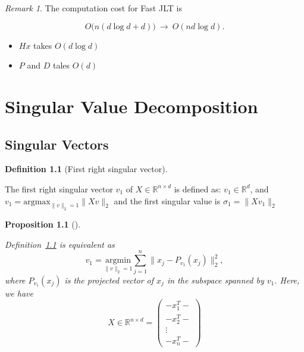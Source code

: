 \documentclass[
  letterpaper,
  DIV=11,
  numbers=noendperiod]{scrreprt}
\providecommand{\tightlist}{%
  \setlength{\itemsep}{0pt}\setlength{\parskip}{0pt}}
\theoremstyle{definition}
\newtheorem{definition}{Definition}[chapter]
\theoremstyle{plain}
\theoremstyle{plain}
\newtheorem{proposition}{Proposition}[chapter]
\theoremstyle{definition}
\theoremstyle{plain}
\theoremstyle{plain}
\theoremstyle{remark}
\newtheorem*{remark}{Remark}
\begin{document}
\begin{remark}
The computation cost for Fast JLT is

\[
O\big(n(d \log d + d)\big) \ \longrightarrow\ O(n d \log d).
\]

\begin{itemize}
\tightlist
\item
  \(Hx\) takes \(O(d\log d)\)
\item
  \(P\) and \(D\) tales \(O(d)\)
\end{itemize}

\end{remark}

\chapter{Singular Value
Decomposition}\label{singular-value-decomposition}

\section{Singular Vectors}\label{singular-vectors}

\begin{definition}[First right singular
vector]\protect\hypertarget{def-1stSingularVec}{}\label{def-1stSingularVec}

The first right singular vector \(v_1\) of
\(X \in \mathbb{R}^{n \times d}\) is defined as:
\(v_1 \in \mathbb{R}^d\), and
\(v_1 = \text{argmax}_{\|v\|_2=1} \|Xv\|_2\) and the first singular
value is \(\sigma_1 = \|Xv_1\|_2\)

\end{definition}

\begin{proposition}[]\protect\hypertarget{prp-equivSingular}{}\label{prp-equivSingular}

Definition~\ref{def-1stSingularVec} is equivalent as \[
v_1 = \underset{\|v\|_2=1}{\mathrm{argmin}} \sum_{j=1}^{n} \|x_j - P_{v_1}(x_j)\|_2^2,
\] where \(P_{v_1}(x_j)\) is the projected vector of \(x_j\) in the
subspace spanned by \(v_1\). Here, we have \[
X \in \mathbb{R}^{n \times d} = 
\begin{pmatrix} -x_1^T- \\ -x_2^T- \\ \vdots \\ -x_n^T- \end{pmatrix}
\]

\end{proposition}
\end{document}
